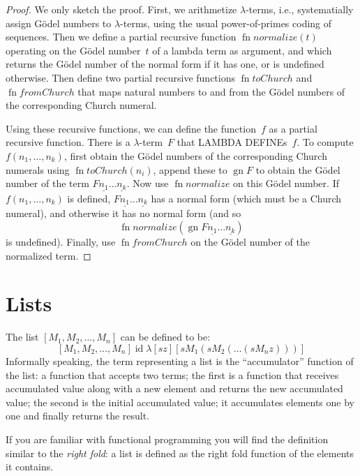 \documentclass[10pt,a4paper]{article}
\newcommand*{\olup}[1]{\MakeUppercase{#1}}
\theoremstyle{plain}
\theoremstyle{definition}
\theoremstyle{remark}
\newenvironment{digress}{}{}
\newcommand*{\olfileid}[3]{}
\newcommand*{\olsection}[1]{\section*{#1}}
\providecommand{\num}[1]{\underline{#1}}
\providecommand{\lambd}{\ensuremath{\lambda}}
\providecommand{\Gn}{\operatorname{gn}}
\providecommand{\ident}{\operatorname{id}}
\providecommand{\fn}{\operatorname{fn}}
\begin{document}
\begin{proof}
  We only sketch the proof. First, we arithmetize $\lambd$-terms,
  i.e., systematially assign G\"odel numbers to $\lambd$-terms, using
  the usual power-of-primes coding of sequences. Then we define a
  partial recursive function $\fn{normalize}(t)$ operating on the
  G\"odel number~$t$ of a lambda term as argument, and which returns
  the G\"odel number of the normal form if it has one, or is undefined
  otherwise.  Then define two partial recursive functions
  $\fn{toChurch}$ and $\fn{fromChurch}$ that maps natural numbers to
  and from the G\"odel numbers of the corresponding Church numeral.

  Using these recursive functions, we can define the function~$f$ as a
  partial recursive function. There is a $\lambd$-term~$F$ that
  \olup{lambda define}s~$f$. To compute $f(n_1, \dots, n_k)$, first obtain
  the G\"odel numbers of the corresponding Church numerals using
  $\fn{toChurch}(n_i)$, append these to $\Gn{F}$ to obtain the G\"odel
  number of the term $F \num{n_1}\dots\num{n_k}$. Now use
  $\fn{normalize}$ on this G\"odel number. If $f(n_1, \dots, n_k)$ is
  defined, $F \num{n_1}\dots\num{n_k}$ has a normal form (which must
  be a Church numeral), and otherwise it has no normal form (and so
  \[\fn{normalize}(\Gn{F\num{n_1}\dots\num{n_k}})\] is undefined).
  Finally, use $\fn{fromChurch}$ on the G\"odel number of the
  normalized term.
\end{proof}





\olfileid{lam}{ldf}{lst}
\olsection{Lists}

The list $[M_1, M_2, \ldots, M_n]$ can be defined to be:
\[
  [M_1, M_2, \ldots, M_n] \ident \lambd[sz][s M_1 (s M_2 (\ldots (s M_n z)))]
\]
Informally speaking, the term representing a list is the
``accumulator'' function of the list: a function that accepts two
terms; the first is a function that receives accumulated value along
with a new element and returns the new accumulated value; the second
is the initial accumulated value; it accumulates elements one by one
and finally returns the result.

\begin{digress}
  If you are familiar with functional programming you will find the
  definition similar to the \emph{right fold}: a list is defined as
  the right fold function of the elements it contains.
\end{digress}
\end{document}
